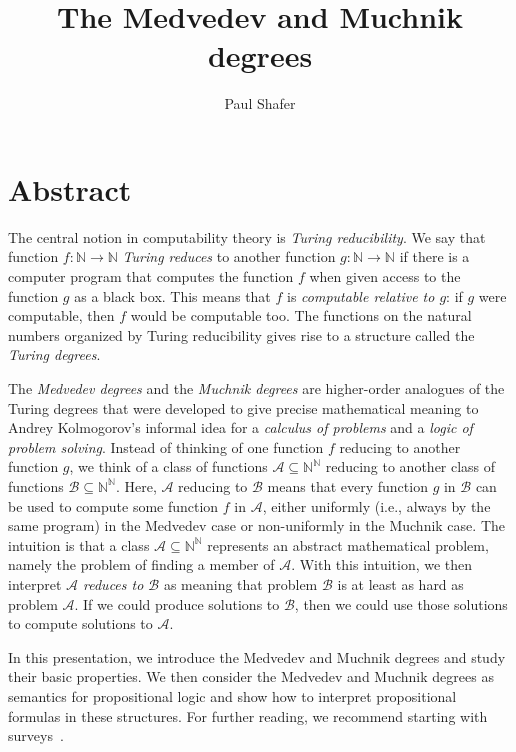 \documentclass[11pt]{amsart}
\title{The Medvedev and Muchnik degrees}
\author{Paul Shafer}
\newcommand{\Nb}{\mathbb{N}}
\newcommand{\mc}[1]{\mathcal{#1}}
\begin{document}
\maketitle

\section*{Abstract}

The central notion in computability theory is \emph{Turing reducibility}.  We say that function $f \colon \Nb \to \Nb$ \emph{Turing reduces} to another function $g \colon \Nb \to \Nb$ if there is a computer program that computes the function $f$ when given access to the function $g$ as a black box.  This means that $f$ is \emph{computable relative to $g$}:  if $g$ were computable, then $f$ would be computable too.  The functions on the natural numbers organized by Turing reducibility gives rise to a structure called the \emph{Turing degrees}.

The \emph{Medvedev degrees} and the \emph{Muchnik degrees} are higher-order analogues of the Turing degrees that were developed to give precise mathematical meaning to Andrey Kolmogorov's informal idea for a \emph{calculus of problems} and a \emph{logic of problem solving}.  Instead of thinking of one function $f$ reducing to another function $g$, we think of a class of functions $\mc{A} \subseteq \Nb^\Nb$ reducing to another class of functions $\mc{B} \subseteq \Nb^\Nb$.  Here, $\mc{A}$ reducing to $\mc{B}$ means that every function $g$ in $\mc{B}$ can be used to compute some function $f$ in $\mc{A}$, either uniformly (i.e., always by the same program) in the Medvedev case or non-uniformly in the Muchnik case.  The intuition is that a class $\mc{A} \subseteq \Nb^\Nb$ represents an abstract mathematical problem, namely the problem of finding a member of $\mc{A}$.  With this intuition, we then interpret \emph{$\mc{A}$ reduces to $\mc{B}$} as meaning that problem $\mc{B}$ is at least as hard as problem $\mc{A}$.  If we could produce solutions to $\mc{B}$, then we could use those solutions to compute solutions to $\mc{A}$.

In this presentation, we introduce the Medvedev and Muchnik degrees and study their basic properties.  We then consider the Medvedev and Muchnik degrees as semantics for propositional logic and show how to interpret propositional formulas in these structures.  For further reading, we recommend starting with surveys~\cites{HinmanSurvey,SimpsonMassProblems,SorbiSurvey}.
\end{document}
